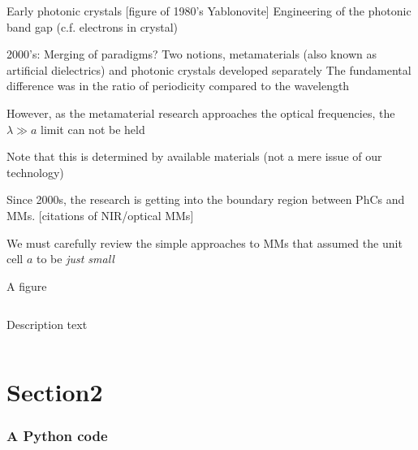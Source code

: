 \documentclass[t]{beamer} \usepackage[czech]{babel} \usepackage[utf8]{inputenc} \usetheme{Frankfurt} %
\begin{document}
\begin{frame}{Early photonic crystals} 		%
[figure of 1980's Yablonovite]    
Engineering of the photonic band gap (c.f. electrons in crystal)
\end{frame} 		%

\begin{frame}{2000's: Merging of paradigms?} 		%
Two notions, metamaterials (also known as artificial dielectrics) and photonic crystals developed separately
The fundamental difference was in the ratio of periodicity compared to the wavelength

However, as the metamaterial research approaches the optical frequencies,  the $\lambda \gg a$ limit can not be held

Note that this is determined by available materials (not a mere issue of our technology)

Since 2000s, the research is getting into the boundary region between PhCs and MMs. [citations of NIR/optical MMs] 

We must carefully review the simple approaches to MMs that assumed the unit cell $a$ to be \textit{just small}
\end{frame} 		%




\begin{frame}{}	%
\end{frame} 		%


\begin{frame}{A figure}	%

\begin{columns}[T] %
\begin{column}{.5\textwidth}
\vspace{3mm}
\noindent Description text
\end{column}%
\begin{column}{.5\textwidth}
\end{column}%
\end{columns}

\end{frame} 		%

\section{Section2}
\begin{frame}[fragile] \frametitle{A Python code}%
\begin{scriptsize}
\end{scriptsize}
\end{frame}
\end{document}
